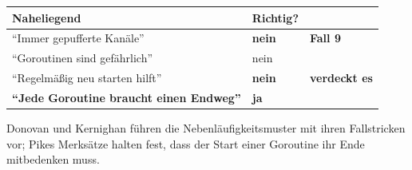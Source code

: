 \begin{warnung}
\begin{center}
\renewcommand{\arraystretch}{1.5}
\begin{tabular}{@{}P{3.2cm}P{2.2cm}P{2.4cm}@{}}
\toprule
\textbf{Naheliegend} & \textbf{Richtig?} & \\
\midrule
\enquote{Immer gepufferte Kanäle} & \textcolor{akzent}{\textbf{nein}} & \textbf{Fall 9}\\
\enquote{Goroutinen sind gefährlich} & \textcolor{akzent}{nein} & \\
\enquote{Regelmäßig neu starten hilft} & \textcolor{akzent}{\textbf{nein}} & \textcolor{akzent}{\textbf{verdeckt es}}\\
\textbf{\enquote{Jede Goroutine braucht einen Endweg}} & \textcolor{gruen}{\textbf{ja}} & \\
\bottomrule
\end{tabular}
\end{center}

\begin{center}
\begin{minipage}{0.88\textwidth}
\end{minipage}
\end{center}

\begin{center}
\end{center}
\end{warnung}
\vspace{-4pt}
\noindent Donovan und Ker\-nig\-han führen die Ne\-ben\-läu\-fig\-keits\-mus\-ter mit ihren Fall\-stri\-cken vor; Pikes Merk\-sät\-ze halten fest, dass der Start einer Go\-rou\-ti\-ne ihr Ende mit\-be\-den\-ken muss.
